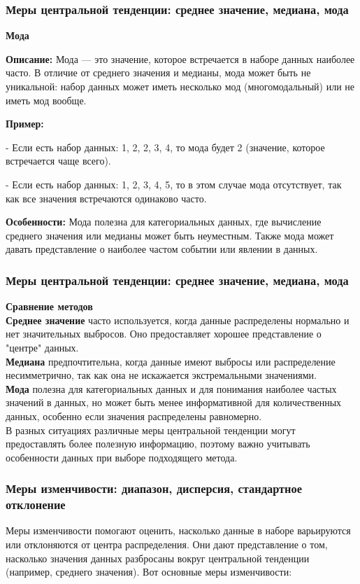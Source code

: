 \documentclass[aspectratio=169]{beamer}
\begin{document}
\begin{frame}
\frametitle{Меры центральной тенденции: среднее значение, медиана, мода}
\textbf{Мода}

\textbf{Описание:} Мода — это значение, которое встречается в наборе данных наиболее часто. В отличие от среднего значения и медианы, мода может быть не уникальной: набор данных может иметь несколько мод (многомодальный) или не иметь мод вообще.

\textbf{Пример:}

\quad- Если есть набор данных: 1, 2, 2, 3, 4, то мода будет 2 (значение, которое встречается чаще всего).

\quad- Если есть набор данных: 1, 2, 3, 4, 5, то в этом случае мода отсутствует, так как все значения встречаются одинаково часто.

\textbf{Особенности:} Мода полезна для категориальных данных, где вычисление среднего значения или медианы может быть неуместным. Также мода может давать представление о наиболее частом событии или явлении в данных.
\end{frame}

\begin{frame}
\frametitle{Меры центральной тенденции: среднее значение, медиана, мода}
\textbf{Сравнение методов}
\newline\\
\textbf{Среднее значение} часто используется, когда данные распределены нормально и нет значительных выбросов. Оно предоставляет хорошее представление о "центре" данных.
\newline\\
\textbf{Медиана} предпочтительна, когда данные имеют выбросы или распределение несимметрично, так как она не искажается экстремальными значениями.
\newline\\
\textbf{Мода} полезна для категориальных данных и для понимания наиболее частых значений в данных, но может быть менее информативной для количественных данных, особенно если значения распределены равномерно.
\newline\\
В разных ситуациях различные меры центральной тенденции могут предоставлять более полезную информацию, поэтому важно учитывать особенности данных при выборе подходящего метода.
\end{frame}

\begin{frame}
\frametitle{Меры изменчивости: диапазон, дисперсия, стандартное отклонение}
Меры изменчивости помогают оценить, насколько данные в наборе варьируются или отклоняются от центра распределения. Они дают представление о том, насколько значения данных разбросаны вокруг центральной тенденции (например, среднего значения). Вот основные меры изменчивости:
\end{frame}
\end{document}

